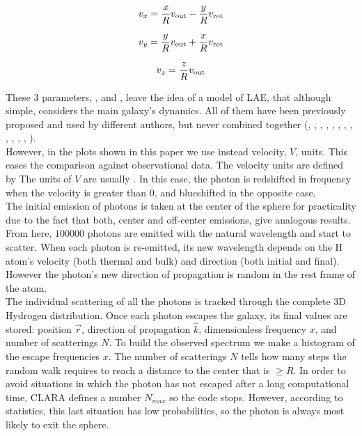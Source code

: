 \documentclass[twocolappendix]{latex/emulateapj}
\begin{document}
\begin{equation}
	v_{x}=\frac{x}{R}v_{\rm out}-\frac{y}{R}v_{\rm rot} 
	\label{eq:vx}
\end{equation}

\begin{equation}
	v_{y}=\frac{y}{R}v_{\rm out}+\frac{x}{R}v_{\rm rot} 
	\label{eq:vy}
\end{equation}

\begin{equation}
	v_{z}=\frac{z}{R}v_{\rm out}
	\label{eq:vz}
\end{equation}

These 3 parameters, \vrot, \vout and \tauh, leave the idea of a model of LAE, that although simple, considers the main galaxy's dynamics. All of them have been previously proposed and used by different authors, but never combined together (\cite{Adams72}, \cite{Harrington73}, \cite{Neufeld90}, \cite{Dijkstra06}, \cite{Verhamme06}, \cite{Forero12}, \cite{Martin2015}, \cite{Garavito14}, \cite{Neufeld91}, \cite{Laursen09}, \cite{Barnes11}, \cite{Verhamme12}, \cite{Yajima12}).\\

However, in the plots shown in this paper we use instead velocity, $V$, units. This eases the comparison against observational data. The velocity units are defined by
The units of $V$ are usually \kms. In this case, the photon is redshifted in frequency when the velocity is greater than 0, and blueshifted in the opposite case. \\

The initial emission of photons is taken at the center of the sphere for practicality due to the fact that both, center and off-center emissions, give analogous results. From here, $100000$ photons are emitted with the natural \lya wavelength and start to scatter. When each photon is re-emitted, its new wavelength depends on the H atom's velocity (both thermal and bulk) and direction (both initial and final). However the photon's new direction of propagation is random in the rest frame of the atom. \\ 

The individual scattering of all the photons is tracked through the complete 3D Hydrogen distribution. Once each photon escapes the galaxy, its final values are stored: position $\vec{r}$, direction of propagation $\hat{k}$, dimensionless frequency $x$, and number of scatterings $N$. To build the observed spectrum we make a histogram of the escape frequencies $x$. The number of scatterings $N$ tells how many steps the random walk requires to reach a distance to the center that is $\geq R$. In order to avoid situations in which the photon has not escaped after a long computational time, CLARA defines a number $N_{max}$ so the code stops. However, according to statistics, this last situation has low probabilities, so the photon is always most likely to exit the sphere. \\
\end{document}
